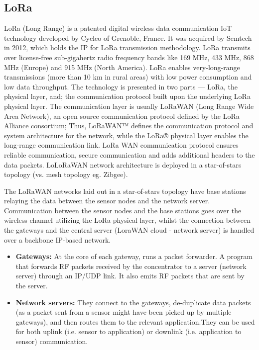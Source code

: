 \subsection{LoRa}
LoRa (Long Range)\cite{LoRa} is a patented digital wireless data communication IoT technology developed by Cycleo of Grenoble, France. It was acquired by Semtech in 2012, which holds the IP for LoRa transmission methodology. LoRa transmits over license-free sub-gigahertz radio frequency bands like 169 MHz, 433 MHz, 868 MHz (Europe) and 915 MHz (North America). LoRa enables very-long-range transmissions (more than 10 km in rural areas) with low power consumption and low data throughput.
The technology is presented in two parts — LoRa, the physical layer, and; the communication protocol built upon the underlying LoRa physical layer. The communication layer is usually LoRaWAN (Long Range Wide Area Network), an open source communication protocol defined by the LoRa Alliance consortium; Thus, LoRaWAN™ defines the communication protocol and system architecture for the network, while the LoRa® physical layer enables the long-range communication link. LoRa WAN communication protocol ensures reliable communication, secure communication and adds additional headers to the data packets. LoLoRaWAN network architecture is deployed in a star-of-stars topology (vs. mesh topology eg. Zibgee).

The LoRaWAN networks laid out in a star-of-stars topology have base stations relaying the data between the sensor nodes and the network server.
Communication between the sensor nodes and the base stations goes over the wireless channel utilizing the LoRa physical layer, whilst the connection between the gateways and the central server (LoraWAN cloud - network server) is handled over a backbone IP-based network. 

\begin{itemize}
    \item \textbf{Gateways:} At the core of each gateway, runs a packet forwarder\cite{packetfor}. A program that forwards RF packets received by the concentrator to a server (network server) through an IP/UDP link. It also emits RF packets that are sent by the server.
    \item \textbf{Network servers:} They connect to the gateways, de-duplicate data packets (as a packet sent from a sensor might have been picked up by multiple gateways), and then routes them to the relevant application.They can be used for both uplink (i.e. sensor to application) or downlink (i.e. application to sensor) communication. 

\end{itemize}

